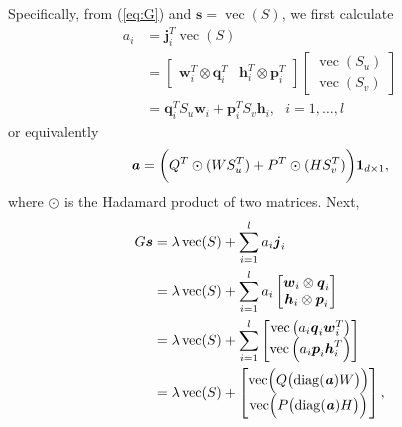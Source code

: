 \documentclass[11pt,twoside]{article}
\newcommand{\bsym}[1]{\ensuremath{\boldsymbol{#1}}}
\newcommand{\bw}{\ensuremath{\bsym{w}}}
\newcommand{\bj}{\ensuremath{\bsym{j}}}
\newcommand{\bp}{\ensuremath{\bsym{p}}}
\newcommand{\bq}{\ensuremath{\bsym{q}}}
\newcommand{\bh}{\ensuremath{\bsym{h}}}
\newcommand{\bs}{\ensuremath{\bsym{s}}}
\DeclareMathOperator*{\diag}{diag}
\DeclareMathOperator*{\vectorize}{vec}
\begin{document}
Specifically, from (\ref{eq:G}) and $\bs=\vectorize(S)$, we first calculate
\begin{equation}
\begin{aligned}
    a_i&= \bj_i^T \vectorize(S)\\
    &=\begin{bmatrix} \bw_i^T\otimes\bq_i^T & \bh_i^T\otimes\bp_i^T \end{bmatrix}\begin{bmatrix}\vectorize(S_u)\\ \vectorize(S_v)\end{bmatrix}\\
    &=\bq_i^T S_u \bw_i + \bp_i^T S_v \bh_i, \text{ }i=1,\dots,l
    \label{eq:DefZi}
\end{aligned}
\end{equation}
or equivalently
\begin{equation}
    \textbf{\textit{a}} = \biggl({Q^T}\odot{(WS_u^T)}+{P^T}\odot{(HS_v^T)}\biggr) \bsym{1}_{d\times 1}
    \label{eq:CalcZ},
\end{equation}
where $\odot$ is the Hadamard product of two matrices.  Next,
\begin{align}
    G \bs         &= \lambda \vectorize(S) + \sum_{i=1}^l a_i \bj_i \\
                  &= \lambda \vectorize(S) + \sum_{i=1}^l a_i \begin{bmatrix} \bw_i\otimes \bq_i \\ \bh_i\otimes \bp_i \end{bmatrix} \nonumber \\
                  &= \lambda \vectorize(S) +  \sum_{i=1}^l \begin{bmatrix}\vectorize\left(a_i \bq_i \bw_i^T\right) \\ \vectorize\left(a_i \bp_i \bh_i^T\right)\end{bmatrix} \nonumber  \\
                  &= \lambda \vectorize(S) +  \begin{bmatrix}\vectorize \Bigl ( Q \bigl(\diag(\textbf{\textit{a}}) W \bigr) \Bigr)\\\vectorize \Bigl ( P \bigl ( \diag(\textbf{\textit{a}}) H \bigr) \Bigr)\end{bmatrix} \label{eq:Hv},
\end{align}
\end{document}
